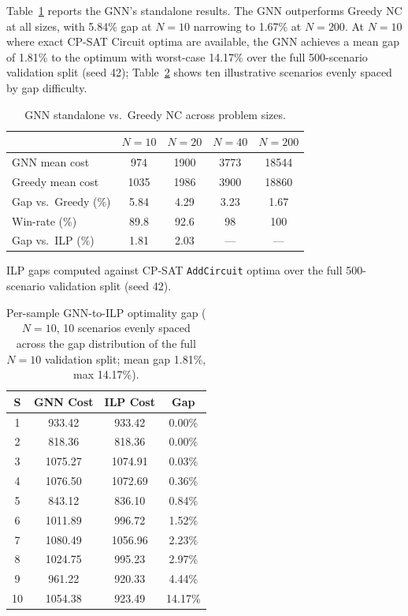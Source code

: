 \documentclass[review,times]{elsarticle}
\begin{document}
Table~\ref{tab:cross_size} reports the GNN's standalone results. The GNN outperforms Greedy NC at all sizes, with 5.84\% gap at $N{=}10$ narrowing to 1.67\% at $N{=}200$. At $N{=}10$ where exact CP-SAT Circuit optima are available, the GNN achieves a mean gap of 1.81\% to the optimum with worst-case 14.17\% over the full 500-scenario validation split (seed 42); Table~\ref{tab:ilp_gap} shows ten illustrative scenarios evenly spaced by gap difficulty.

\begin{table}[htbp]
\caption{GNN standalone vs.\ Greedy NC across problem sizes.}
\label{tab:cross_size}
\centering
\begin{tabular}{@{}lcccc@{}}
\toprule
& $N{=}10$ & $N{=}20$ & $N{=}40$ & $N{=}200$ \\
\midrule
GNN mean cost        & 974   & 1900  & 3773  & 18544 \\
Greedy mean cost     & 1035  & 1986  & 3900  & 18860 \\
Gap vs.\ Greedy (\%)     & 5.84  & 4.29  & 3.23  & 1.67 \\
Win-rate (\%)        & 89.8  & 92.6  & 98    & 100 \\
Gap vs.\ ILP (\%)   & 1.81  & 2.03  & ---   & --- \\
\bottomrule
\end{tabular}
\vspace{1mm}

\footnotesize ILP gaps computed against CP-SAT \texttt{AddCircuit} optima over the full 500-scenario validation split (seed 42).
\end{table}

\begin{table}[htbp]
\caption{Per-sample GNN-to-ILP optimality gap ($N{=}10$, 10 scenarios evenly spaced across the gap distribution of the full $N{=}10$ validation split; mean gap 1.81\%, max 14.17\%).}
\label{tab:ilp_gap}
\centering
\begin{tabular}{@{}cccc@{}}
\toprule
\textbf{S} & \textbf{GNN Cost} & \textbf{ILP Cost} & \textbf{Gap} \\
\midrule
1  & 933.42  & 933.42  & 0.00\% \\
2  & 818.36  & 818.36  & 0.00\% \\
3  & 1075.27 & 1074.91 & 0.03\% \\
4  & 1076.50 & 1072.69 & 0.36\% \\
5  & 843.12  & 836.10  & 0.84\% \\
6  & 1011.89 & 996.72  & 1.52\% \\
7  & 1080.49 & 1056.96 & 2.23\% \\
8  & 1024.75 & 995.23  & 2.97\% \\
9  & 961.22  & 920.33  & 4.44\% \\
10 & 1054.38 & 923.49  & 14.17\% \\
\bottomrule
\end{tabular}
\end{table}
\end{document}
